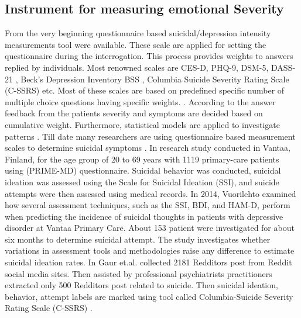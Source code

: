 \documentclass[sn-mathphys,Numbered]{sn-jnl}%
\theoremstyle{thmstyleone}%
\theoremstyle{thmstyletwo}%
\theoremstyle{thmstylethree}%
\begin{document}
\subsection{Instrument for measuring emotional Severity} 
From the very beginning questionnaire based suicidal/depression intensity measurements tool were available. These scale are applied for setting the questionnaire during the interrogation. This process provides weights to answers replied by individuals. Most renowned scales are CES-D, PHQ-9, DSM-5, DASS-21 \cite{radloff1977ces, havigerova2019text}, Beck's Depression Inventory BSS \cite{beck2000weisman}, Columbia Suicide Severity Rating Scale (C-SSRS) \cite{posner2011columbia, joiner1997modified} etc. Most of these scales are based on predefined specific number of multiple choice questions having specific weights. \cite{havigerova2019text, beck1961inventory, kroenke2001phq, tolentino2018dsm, kliem2017german, eke2010hamilton}. According to the answer feedback from the patients severity and symptoms are decided based on cumulative weight. Furthermore, statistical models are applied to investigate patterns \cite{shen2020detecting, shen2017depression}.  Till date many researchers are using questionnaire based measurement scales to determine suicidal symptoms \cite{li2022association}. In \cite{vuorilehto2006suicidal} research study conducted in Vantaa, Finland, for the age group of 20 to 69 years with 1119 primary-care patients using (PRIME-MD) questionnaire. Suicidal behavior was conducted, suicidal ideation was assessed using the Scale for Suicidal Ideation (SSI), and suicide attempts were then assessed using medical records. In 2014, Vuorilehto \cite{vuorilehto2014method} examined how several assessment techniques, such as the SSI, BDI, and HAM-D, perform when predicting the incidence of suicidal thoughts in patients with depressive disorder at Vantaa Primary Care. About 153 patient were investigated for about six months to determine suicidal attempt. The study investigates whether variations in assessment tools and methodologies raise any difference to estimate suicidal ideation rates. In \cite{gaur2019knowledge} Gaur et.al. collected 2181 Redditors post from Reddit social media sites. Then assisted by professional psychiatrists practitioners extracted only 500 Redditors post related to suicide. Then suicidal ideation, behavior, attempt labels are marked using tool called Columbia-Suicide Severity Rating Scale (C-SSRS) \cite{posner2011columbia}. 
\end{document}
